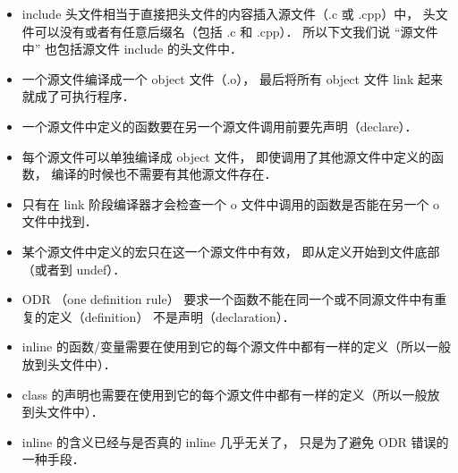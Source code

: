 
\begin{itemize}
\item include 头文件相当于直接把头文件的内容插入源文件（.c 或 .cpp）中， 头文件可以没有或者有任意后缀名（包括 .c 和 .cpp）． 所以下文我们说 “源文件中” 也包括源文件 include 的头文件中．
\item 一个源文件编译成一个 object 文件（.o）， 最后将所有 object 文件 link 起来就成了可执行程序．
\item 一个源文件中定义的函数要在另一个源文件调用前要先声明（declare）．
\item 每个源文件可以单独编译成 object 文件， 即使调用了其他源文件中定义的函数， 编译的时候也不需要有其他源文件存在．
\item 只有在 link 阶段编译器才会检查一个 o 文件中调用的函数是否能在另一个 o 文件中找到．
\item 某个源文件中定义的宏只在这一个源文件中有效， 即从定义开始到文件底部（或者到 undef）．
\item ODR （one definition rule） 要求一个函数不能在同一个或不同源文件中有重复的定义（definition） 不是声明（declaration）．
\item inline 的函数/变量需要在使用到它的每个源文件中都有一样的定义（所以一般放到头文件中）．
\item class 的声明也需要在使用到它的每个源文件中都有一样的定义（所以一般放到头文件中）．
\item inline 的含义已经与是否真的 inline 几乎无关了， 只是为了避免 ODR 错误的一种手段．
\end{itemize}
